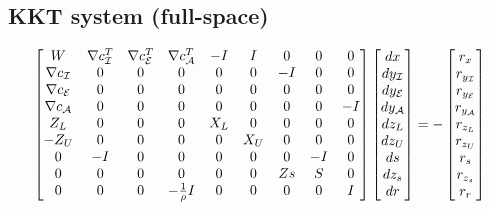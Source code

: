 \documentclass[10pt]{article}
\begin{document}
	\subsection*{KKT system (full-space)}
	\begin{equation}
		\begin{aligned}
			\begin{bmatrix}
				W & \nabla c_{\mathcal I}^T & \nabla c_{\mathcal E}^T & \nabla c_{\mathcal A}^T & -I & I & 0 & 0 & 0\\
				\nabla c_{\mathcal I} & 0 & 0 & 0 & 0 & 0 & -I & 0 & 0\\
				\nabla c_{\mathcal E} & 0 & 0 & 0 & 0 & 0 & 0 & 0 & 0\\
				\nabla c_{\mathcal A} & 0 & 0 & 0 & 0 & 0 & 0 & 0 & -I\\
				Z_L & 0 & 0 & 0 & X_L & 0 & 0 & 0 & 0\\
				-Z_U & 0 & 0 & 0 & 0 & X_U & 0 & 0 & 0\\
				0 & -I & 0 & 0 & 0 & 0 & 0 & -I & 0\\
				0 & 0 & 0 & 0 & 0 & 0 & Zs & S & 0\\
				0 & 0 & 0 & -\frac{1}{\rho}I & 0 & 0 & 0 & 0 & I\\
			\end{bmatrix}
			\begin{bmatrix}
				dx \\
				dy_{\mathcal I} \\
				dy_{\mathcal E} \\
				dy_{\mathcal A} \\
				dz_L \\
				dz_U \\
				ds \\
				dz_s \\
				dr \\
			\end{bmatrix}
			=
			-\begin{bmatrix}
				r_x \\
				r_{y_{\mathcal I}} \\
				r_{y_{\mathcal E}} \\
				r_{y_{\mathcal A}} \\
				r_{z_L} \\
				r_{z_U} \\
				r_s \\
				r_{z_s} \\
				r_r \\
			\end{bmatrix}
		\end{aligned} \notag
	\end{equation}
	 
\end{document}
